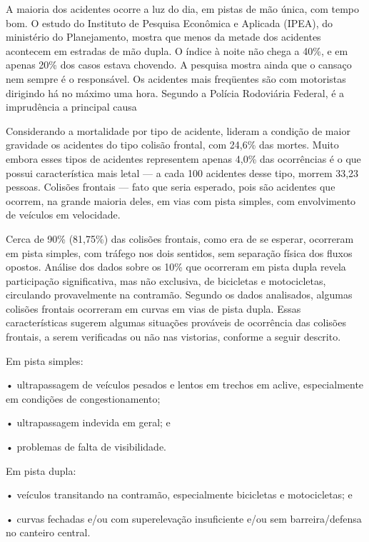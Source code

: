 A maioria dos acidentes ocorre a luz do dia, em pistas de mão única, com tempo bom. O estudo do Instituto de Pesquisa
Econômica e Aplicada (IPEA), do ministério do Planejamento, mostra que menos da metade dos acidentes acontecem em estradas
de mão dupla. O índice à noite não chega a 40\%, e em apenas 20\% dos casos estava chovendo. A pesquisa mostra ainda que o
 cansaço nem sempre é o responsável. Os acidentes mais freqüentes são com motoristas dirigindo há no máximo uma hora.
 Segundo a Polícia Rodoviária Federal, é a imprudência a principal causa \cite{acidentesDeTransitoNoBrasil}

 Considerando a mortalidade por tipo de acidente, lideram a condição de maior gravidade os acidentes do tipo colisão
 frontal, com 24,6\% das mortes. Muito embora esses tipos de acidentes representem apenas 4,0\% das ocorrências é o que
 possui característica mais letal — a cada 100 acidentes desse tipo, morrem 33,23 pessoas. Colisões frontais — fato que
 seria esperado, pois são acidentes que ocorrem, na grande maioria deles, em vias com pista simples, com envolvimento de
 veículos em velocidade. \cite{custos_acidentes_transito}

 Cerca de 90\% (81,75\%) das colisões frontais, como era de se esperar, ocorreram em pista simples, com
 tráfego nos dois sentidos, sem separação física dos fluxos opostos. Análise dos dados sobre os 10\% que
 ocorreram em pista dupla revela participação significativa, mas não exclusiva, de bicicletas e motocicletas,
 circulando provavelmente na contramão. Segundo os dados analisados, algumas colisões frontais ocorreram em
 curvas em vias de pista dupla. Essas características sugerem algumas situações prováveis de ocorrência das
 colisões frontais, a serem verificadas ou não nas vistorias, conforme a seguir descrito. \cite{fatoresCondicionantesGravidade}

 Em pista simples:

 • ultrapassagem de veículos pesados e lentos em trechos em aclive, especialmente
em condições de congestionamento;

 • ultrapassagem indevida em geral; e

 • problemas de falta de visibilidade.

 Em pista dupla:

 • veículos transitando na contramão, especialmente bicicletas e motocicletas; e

 • curvas fechadas e/ou com superelevação insuficiente e/ou sem barreira/defensa
 no canteiro central.


